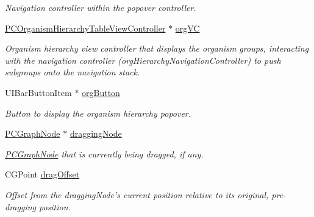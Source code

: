 \begin{Indent}
\begin{DoxyCompactItemize}
\begin{DoxyCompactList}\small\item\em Navigation controller within the popover controller. \end{DoxyCompactList}\item 
\hypertarget{interface_p_c_graph_view_controller_afd4c123f8eafecd662d017d053867cee}{
\hyperlink{interface_p_c_organism_hierarchy_table_view_controller}{PCOrganismHierarchyTableViewController} $\ast$ \hyperlink{interface_p_c_graph_view_controller_afd4c123f8eafecd662d017d053867cee}{orgVC}}
\label{interface_p_c_graph_view_controller_afd4c123f8eafecd662d017d053867cee}

\begin{DoxyCompactList}\small\item\em Organism hierarchy view controller that displays the organism groups, interacting with the navigation controller (orgHierarchyNavigationController) to push subgroups onto the navigation stack. \end{DoxyCompactList}\item 
\hypertarget{interface_p_c_graph_view_controller_ab5087bbafd9e6483d6d7a62ff02d649f}{
UIBarButtonItem $\ast$ \hyperlink{interface_p_c_graph_view_controller_ab5087bbafd9e6483d6d7a62ff02d649f}{orgButton}}
\label{interface_p_c_graph_view_controller_ab5087bbafd9e6483d6d7a62ff02d649f}

\begin{DoxyCompactList}\small\item\em Button to display the organism hierarchy popover. \end{DoxyCompactList}\item 
\hypertarget{interface_p_c_graph_view_controller_a1d59a5a52716071700e57d860b893d74}{
\hyperlink{interface_p_c_graph_node}{PCGraphNode} $\ast$ \hyperlink{interface_p_c_graph_view_controller_a1d59a5a52716071700e57d860b893d74}{draggingNode}}
\label{interface_p_c_graph_view_controller_a1d59a5a52716071700e57d860b893d74}

\begin{DoxyCompactList}\small\item\em \hyperlink{interface_p_c_graph_node}{PCGraphNode} that is currently being dragged, if any. \end{DoxyCompactList}\item 
\hypertarget{interface_p_c_graph_view_controller_aa60b5cebc7963e66f0d4f8ac8b8716bc}{
CGPoint \hyperlink{interface_p_c_graph_view_controller_aa60b5cebc7963e66f0d4f8ac8b8716bc}{dragOffset}}
\label{interface_p_c_graph_view_controller_aa60b5cebc7963e66f0d4f8ac8b8716bc}

\begin{DoxyCompactList}\small\item\em Offset from the draggingNode's current position relative to its original, pre-\/dragging position. \end{DoxyCompactList}\end{DoxyCompactItemize}
\end{Indent}


